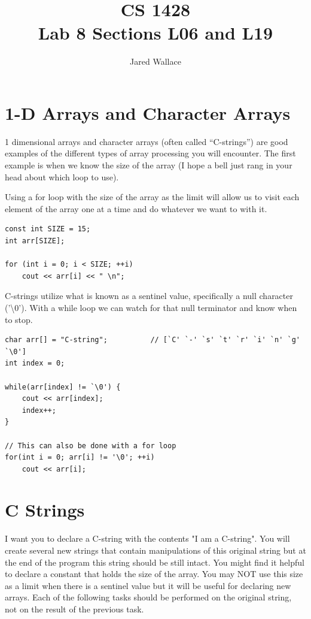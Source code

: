 \documentclass[letterpaper,12pt]{article}
\title{\Large CS 1428\\Lab 8 Sections L06 and L19}
\author{Jared Wallace}
\date{}
\begin{document}
\maketitle

\section*{1-D Arrays and Character Arrays}
1 dimensional arrays and character arrays (often called ``C-strings'') are good examples
of the different types of array processing you will encounter.  The first example is when 
we know the size of the array (I hope a bell just rang in your head about which loop to use).

Using a for loop with the size of the array as the limit will allow us to visit each element 
of the array one at a time and do whatever we want to with it.

\begin{lstlisting}[basicstyle=\footnotesize\ttfamily]
const int SIZE = 15;
int arr[SIZE];

for (int i = 0; i < SIZE; ++i)
	cout << arr[i] << " \n";

\end{lstlisting}

C-strings utilize what is known as a sentinel value, specifically a null character ('\textbackslash{}0').  With
a while loop we can watch for that null terminator and know when to stop.

\begin{lstlisting}[basicstyle=\footnotesize\ttfamily]
char arr[] = "C-string";          // [`C' `-' `s' `t' `r' `i' `n' `g' `\0']
int index = 0;

while(arr[index] != `\0') {
	cout << arr[index];
	index++;
}

// This can also be done with a for loop
for(int i = 0; arr[i] != '\0'; ++i)
	cout << arr[i];
\end{lstlisting}

\section*{C Strings}
I want you to declare a C-string with the contents "I am a C-string".  You will create several
new strings that contain manipulations of this original string but at the end of the program this
string should be still intact. You might find it helpful to declare a constant that holds the size
of the array.  You may NOT use this size as a limit when there is a sentinel value but it will be
useful for declaring new arrays. Each of the following tasks should be performed on the original
string, not on the result of the previous task.
\end{document}
